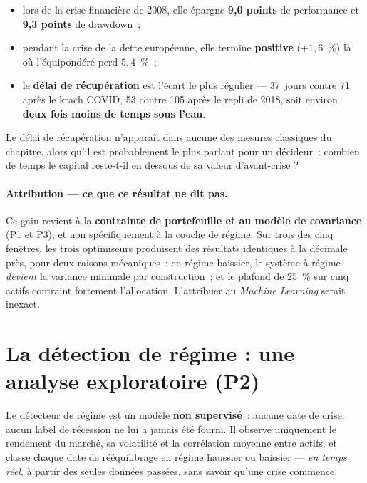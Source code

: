 \begin{itemize}
  \item lors de la crise financière de 2008, elle épargne \textbf{9,0 points} de
        performance et \textbf{9,3 points} de drawdown~;
  \item pendant la crise de la dette européenne, elle termine \textbf{positive}
        ($+1{,}6$~\%) là où l'équipondéré perd $5{,}4$~\%~;
  \item le \textbf{délai de récupération} est l'écart le plus régulier —
        37~jours contre 71 après le krach COVID, 53 contre 105 après le repli de
        2018, soit environ \textbf{deux fois moins de temps sous l'eau}.
\end{itemize}

\begin{remarquebox}
Le délai de récupération n'apparaît dans aucune des mesures classiques du
chapitre, alors qu'il est probablement le plus parlant pour un décideur~:
combien de temps le capital reste-t-il en dessous de sa valeur d'avant-crise ?
\end{remarquebox}

\paragraph{Attribution — ce que ce résultat ne dit pas.} Ce gain revient à la
\textbf{contrainte de portefeuille et au modèle de covariance} (P1 et P3), et non
spécifiquement à la couche de régime. Sur trois des cinq fenêtres, les trois
optimiseurs produisent des résultats identiques à la décimale près, pour deux
raisons mécaniques~: en régime baissier, le système à régime \emph{devient} la
variance minimale par construction~; et le plafond de 25~\% sur cinq actifs
contraint fortement l'allocation. L'attribuer au \emph{Machine Learning} serait
inexact.

\section{La détection de régime : une analyse exploratoire (P2)}

Le détecteur de régime est un modèle \textbf{non supervisé}~: aucune date de
crise, aucun label de récession ne lui a jamais été fourni. Il observe uniquement
le rendement du marché, sa volatilité et la corrélation moyenne entre actifs, et
classe chaque date de rééquilibrage en régime haussier ou baissier — \emph{en
temps réel}, à partir des seules données passées, sans savoir qu'une crise
commence.

